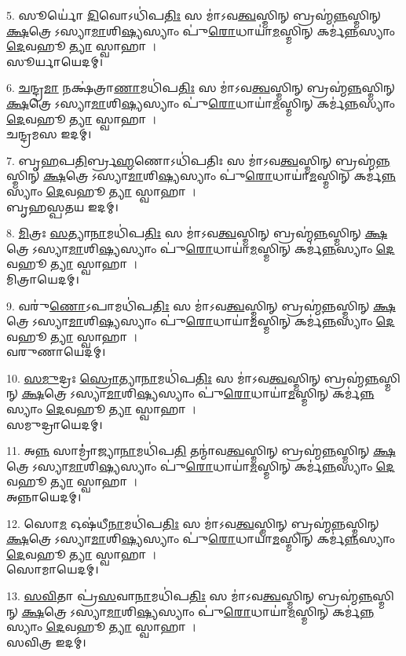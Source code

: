 5. 𑌸𑍂𑌰𑍍𑌯𑍋॑ \ul{𑌦𑌿}𑌵𑍋𑌽𑌧𑌿॑𑌪\ul{𑌤𑌿𑌃} 𑌸 𑌮𑌾॑𑌽𑌵\ul{𑌤𑍍𑌵}𑌸𑍍𑌮𑌿𑌨𑍍 𑌬𑍍𑌰𑌹𑍍𑌮॑\ul{𑌨𑍍𑌨}𑌸𑍍𑌮𑌿𑌨𑍍 \ul{𑌕𑍍𑌷}𑌤𑍍𑌰𑍇𑌽𑌸𑍍𑌯𑌾\ul{𑌮𑌾}𑌶𑌿\ul{𑌷𑍍𑌯}𑌸𑍍𑌯𑌾𑌂 𑌪𑍁॑\ul{𑌰𑍋}𑌧𑌾𑌯𑌾॑\ul{𑌮}𑌸𑍍𑌮𑌿𑌨𑍍 𑌕𑌰𑍍𑌮॑\ul{𑌨𑍍𑌨}𑌸𑍍𑌯𑌾𑌂 \ul{𑌦𑍇}𑌵𑌹𑍂\ul{𑌤𑍍𑌯𑌾} 𑌸𑍍𑌵𑌾𑌹𑌾।\\
𑌸𑍂𑌰𑍍𑌯𑌾𑌯𑍇𑌦𑌮𑍍।

6. \ul{𑌚}𑌨𑍍𑌦𑍍𑌰\ul{𑌮𑌾} 𑌨𑌕𑍍𑌷॑𑌤𑍍𑌰𑌾\ul{𑌣𑌾}𑌮𑌧𑌿॑𑌪\ul{𑌤𑌿𑌃} 𑌸 𑌮𑌾॑𑌽𑌵\ul{𑌤𑍍𑌵}𑌸𑍍𑌮𑌿𑌨𑍍 𑌬𑍍𑌰𑌹𑍍𑌮॑\ul{𑌨𑍍𑌨}𑌸𑍍𑌮𑌿𑌨𑍍 \ul{𑌕𑍍𑌷}𑌤𑍍𑌰𑍇𑌽𑌸𑍍𑌯𑌾\ul{𑌮𑌾}𑌶𑌿\ul{𑌷𑍍𑌯}𑌸𑍍𑌯𑌾𑌂 𑌪𑍁॑\ul{𑌰𑍋}𑌧𑌾𑌯𑌾॑\ul{𑌮}𑌸𑍍𑌮𑌿𑌨𑍍 𑌕𑌰𑍍𑌮॑\ul{𑌨𑍍𑌨}𑌸𑍍𑌯𑌾𑌂 \ul{𑌦𑍇}𑌵𑌹𑍂\ul{𑌤𑍍𑌯𑌾} 𑌸𑍍𑌵𑌾𑌹𑌾।\\
𑌚𑌨𑍍𑌦𑍍𑌰𑌮𑌸 𑌇𑌦𑌮𑍍।

7. 𑌬𑍃\ul{𑌹}𑌪\ul{𑌤𑌿}𑌰𑍍𑌬𑍍𑌰\ul{𑌹𑍍𑌮}𑌣𑍋𑌽𑌧𑌿॑𑌪𑌤𑌿𑌃 𑌸 𑌮𑌾॑𑌽𑌵\ul{𑌤𑍍𑌵}𑌸𑍍𑌮𑌿𑌨𑍍 𑌬𑍍𑌰𑌹𑍍𑌮॑\ul{𑌨𑍍𑌨}𑌸𑍍𑌮𑌿𑌨𑍍 \ul{𑌕𑍍𑌷}𑌤𑍍𑌰𑍇𑌽𑌸𑍍𑌯𑌾\ul{𑌮𑌾}𑌶𑌿\ul{𑌷𑍍𑌯}𑌸𑍍𑌯𑌾𑌂 𑌪𑍁॑\ul{𑌰𑍋}𑌧𑌾𑌯𑌾॑\ul{𑌮}𑌸𑍍𑌮𑌿𑌨𑍍 𑌕𑌰𑍍𑌮॑\ul{𑌨𑍍𑌨}𑌸𑍍𑌯𑌾𑌂 \ul{𑌦𑍇}𑌵𑌹𑍂\ul{𑌤𑍍𑌯𑌾} 𑌸𑍍𑌵𑌾𑌹𑌾।\\
𑌬𑍃𑌹𑌸𑍍𑌪𑌤𑌯 𑌇𑌦𑌮𑍍।

8. \ul{𑌮𑌿}𑌤𑍍𑌰𑌃 \ul{𑌸}𑌤𑍍𑌯𑌾\ul{𑌨𑌾}𑌮𑌧𑌿॑𑌪\ul{𑌤𑌿𑌃} 𑌸 𑌮𑌾॑𑌽𑌵\ul{𑌤𑍍𑌵}𑌸𑍍𑌮𑌿𑌨𑍍 𑌬𑍍𑌰𑌹𑍍𑌮॑\ul{𑌨𑍍𑌨}𑌸𑍍𑌮𑌿𑌨𑍍 \ul{𑌕𑍍𑌷}𑌤𑍍𑌰𑍇𑌽𑌸𑍍𑌯𑌾\ul{𑌮𑌾}𑌶𑌿\ul{𑌷𑍍𑌯}𑌸𑍍𑌯𑌾𑌂 𑌪𑍁॑\ul{𑌰𑍋}𑌧𑌾𑌯𑌾॑\ul{𑌮}𑌸𑍍𑌮𑌿𑌨𑍍 𑌕𑌰𑍍𑌮॑\ul{𑌨𑍍𑌨}𑌸𑍍𑌯𑌾𑌂 \ul{𑌦𑍇}𑌵𑌹𑍂\ul{𑌤𑍍𑌯𑌾} 𑌸𑍍𑌵𑌾𑌹𑌾।\\
𑌮𑌿𑌤𑍍𑌰𑌾𑌯𑍇𑌦𑌮𑍍।

9. 𑌵𑌰𑍁॑\ul{𑌣𑍋}𑌽𑌪𑌾𑌮𑌧𑌿॑𑌪\ul{𑌤𑌿𑌃} 𑌸 𑌮𑌾॑𑌽𑌵\ul{𑌤𑍍𑌵}𑌸𑍍𑌮𑌿𑌨𑍍 𑌬𑍍𑌰𑌹𑍍𑌮॑\ul{𑌨𑍍𑌨}𑌸𑍍𑌮𑌿𑌨𑍍 \ul{𑌕𑍍𑌷}𑌤𑍍𑌰𑍇𑌽𑌸𑍍𑌯𑌾\ul{𑌮𑌾}𑌶𑌿\ul{𑌷𑍍𑌯}𑌸𑍍𑌯𑌾𑌂 𑌪𑍁॑\ul{𑌰𑍋}𑌧𑌾𑌯𑌾॑\ul{𑌮}𑌸𑍍𑌮𑌿𑌨𑍍 𑌕𑌰𑍍𑌮॑\ul{𑌨𑍍𑌨}𑌸𑍍𑌯𑌾𑌂 \ul{𑌦𑍇}𑌵𑌹𑍂\ul{𑌤𑍍𑌯𑌾} 𑌸𑍍𑌵𑌾𑌹𑌾।\\
𑌵𑌰𑍁𑌣𑌾𑌯𑍇𑌦𑌮𑍍।

10. \ul{𑌸}\ul{𑌮𑍁}𑌦𑍍𑌰𑌃 \ul{𑌸𑍍𑌰𑍋}𑌤𑍍𑌯𑌾\ul{𑌨𑌾}𑌮𑌧𑌿॑𑌪\ul{𑌤𑌿𑌃} 𑌸 𑌮𑌾॑𑌽𑌵\ul{𑌤𑍍𑌵}𑌸𑍍𑌮𑌿𑌨𑍍 𑌬𑍍𑌰𑌹𑍍𑌮॑\ul{𑌨𑍍𑌨}𑌸𑍍𑌮𑌿𑌨𑍍 \ul{𑌕𑍍𑌷}𑌤𑍍𑌰𑍇𑌽𑌸𑍍𑌯𑌾\ul{𑌮𑌾}𑌶𑌿\ul{𑌷𑍍𑌯}𑌸𑍍𑌯𑌾𑌂 𑌪𑍁॑\ul{𑌰𑍋}𑌧𑌾𑌯𑌾॑\ul{𑌮}𑌸𑍍𑌮𑌿𑌨𑍍 𑌕𑌰𑍍𑌮॑\ul{𑌨𑍍𑌨}𑌸𑍍𑌯𑌾𑌂 \ul{𑌦𑍇}𑌵𑌹𑍂\ul{𑌤𑍍𑌯𑌾} 𑌸𑍍𑌵𑌾𑌹𑌾।\\
𑌸𑌮𑍁𑌦𑍍𑌰𑌾𑌯𑍇𑌦𑌮𑍍।

11. 𑌅\ul{𑌨𑍍𑌨} 𑌸𑌾𑌮𑍍𑌰𑌾॑॑𑌜𑍍𑌯𑌾\ul{𑌨𑌾}𑌮𑌧𑌿॑𑌪\ul{𑌤𑌿} 𑌤𑌨𑍍𑌮𑌾॑𑌵\ul{𑌤𑍍𑌵}𑌸𑍍𑌮𑌿𑌨𑍍 𑌬𑍍𑌰𑌹𑍍𑌮॑\ul{𑌨𑍍𑌨}𑌸𑍍𑌮𑌿𑌨𑍍 \ul{𑌕𑍍𑌷}𑌤𑍍𑌰𑍇𑌽𑌸𑍍𑌯𑌾\ul{𑌮𑌾}𑌶𑌿\ul{𑌷𑍍𑌯}𑌸𑍍𑌯𑌾𑌂 𑌪𑍁॑\ul{𑌰𑍋}𑌧𑌾𑌯𑌾॑\ul{𑌮}𑌸𑍍𑌮𑌿𑌨𑍍 𑌕𑌰𑍍𑌮॑\ul{𑌨𑍍𑌨}𑌸𑍍𑌯𑌾𑌂 \ul{𑌦𑍇}𑌵𑌹𑍂\ul{𑌤𑍍𑌯𑌾} 𑌸𑍍𑌵𑌾𑌹𑌾।\\
𑌅𑌨𑍍𑌨𑌾𑌯𑍇𑌦𑌮𑍍।

12. 𑌸𑍋\ul{𑌮} 𑌓𑌷॑𑌧𑍀\ul{𑌨𑌾}𑌮𑌧𑌿॑𑌪\ul{𑌤𑌿𑌃} 𑌸 𑌮𑌾॑𑌽𑌵\ul{𑌤𑍍𑌵}𑌸𑍍𑌮𑌿𑌨𑍍 𑌬𑍍𑌰𑌹𑍍𑌮॑\ul{𑌨𑍍𑌨}𑌸𑍍𑌮𑌿𑌨𑍍 \ul{𑌕𑍍𑌷}𑌤𑍍𑌰𑍇𑌽𑌸𑍍𑌯𑌾\ul{𑌮𑌾}𑌶𑌿\ul{𑌷𑍍𑌯}𑌸𑍍𑌯𑌾𑌂 𑌪𑍁॑\ul{𑌰𑍋}𑌧𑌾𑌯𑌾॑\ul{𑌮}𑌸𑍍𑌮𑌿𑌨𑍍 𑌕𑌰𑍍𑌮॑\ul{𑌨𑍍𑌨}𑌸𑍍𑌯𑌾𑌂 \ul{𑌦𑍇}𑌵𑌹𑍂\ul{𑌤𑍍𑌯𑌾} 𑌸𑍍𑌵𑌾𑌹𑌾।\\
𑌸𑍋𑌮𑌾𑌯𑍇𑌦𑌮𑍍।

13. \ul{𑌸}\ul{𑌵𑌿}𑌤𑌾 𑌪𑍍𑌰॑\ul{𑌸}𑌵𑌾\ul{𑌨𑌾}𑌮𑌧𑌿॑𑌪\ul{𑌤𑌿𑌃} 𑌸 𑌮𑌾॑𑌽𑌵\ul{𑌤𑍍𑌵}𑌸𑍍𑌮𑌿𑌨𑍍 𑌬𑍍𑌰𑌹𑍍𑌮॑\ul{𑌨𑍍𑌨}𑌸𑍍𑌮𑌿𑌨𑍍 \ul{𑌕𑍍𑌷}𑌤𑍍𑌰𑍇𑌽𑌸𑍍𑌯𑌾\ul{𑌮𑌾}𑌶𑌿\ul{𑌷𑍍𑌯}𑌸𑍍𑌯𑌾𑌂 𑌪𑍁॑\ul{𑌰𑍋}𑌧𑌾𑌯𑌾॑\ul{𑌮}𑌸𑍍𑌮𑌿𑌨𑍍 𑌕𑌰𑍍𑌮॑\ul{𑌨𑍍𑌨}𑌸𑍍𑌯𑌾𑌂 \ul{𑌦𑍇}𑌵𑌹𑍂\ul{𑌤𑍍𑌯𑌾} 𑌸𑍍𑌵𑌾𑌹𑌾।\\
𑌸𑌵𑌿𑌤𑍍𑌰 𑌇𑌦𑌮𑍍।

